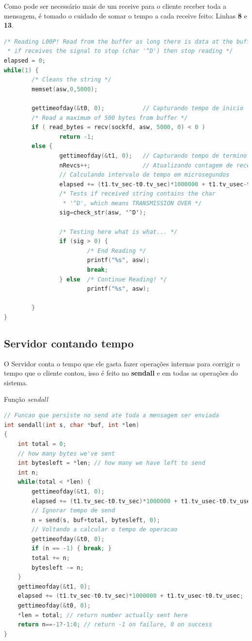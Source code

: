 \documentclass[10pt,a4paper]{report}
\begin{document}
Como pode ser necessário mais de um receive para o cliente receber toda a mensagem, é tomado o cuidado de somar o tempo a cada receive feito: Linhas \textbf{8} e \textbf{13}.
\begin{lstlisting}[language=C]
/* Reading L00P! Read from the buffer as long there is data at the buffer,
 * if receives the signal to stop (char '^D') then stop reading */
elapsed = 0;
while(1) {
        /* Cleans the string */
        memset(asw,0,5000);

        gettimeofday(&t0, 0);           // Capturando tempo de inicio
        /* Read a maximum of 500 bytes from buffer */
        if ( read_bytes = recv(sockfd, asw, 5000, 0) < 0 )
                return -1;
        else {  
                gettimeofday(&t1, 0);   // Capturando tempo de termino 
                nRevcs++;               // Atualizando contagem de receive 
                // Calculando intervalo de tempo em microsegundos
                elapsed += (t1.tv_sec-t0.tv_sec)*1000000 + t1.tv_usec-t0.tv_usec;
                /* Tests if received string contains the char 
                 * '^D', which means TRANSMISSION OVER */
                sig=check_str(asw, '^D');

                /* Testing here what is what... */
                if (sig > 0) {
                        /* End Reading */
                        printf("%s", asw);
                        break;
                } else  /* Continue Reading! */
                        printf("%s", asw);

        }
}
\end{lstlisting}

\subsection{Servidor contando tempo}


O Servidor conta o tempo que ele gasta fazer operações internas para corrigir o tempo que o cliente contou, isso é feito no \textbf{sendall} e em todas as operações do sistema.
\begin{center}
Função \textit{sendall}
\end{center}
\begin{lstlisting}[language=C]
// Funcao que persiste no send ate toda a mensagem ser enviada
int sendall(int s, char *buf, int *len)
{
	int total = 0;
	// how many bytes we've sent
	int bytesleft = *len; // how many we have left to send
	int n;
	while(total < *len) {
		gettimeofday(&t1, 0);
		elapsed += (t1.tv_sec-t0.tv_sec)*1000000 + t1.tv_usec-t0.tv_usec;
		// Ignorar tempo de send
		n = send(s, buf+total, bytesleft, 0);
		// Voltando a calcular o tempo de operacao
		gettimeofday(&t0, 0);
		if (n == -1) { break; }
		total += n;
		bytesleft -= n;
	}
	gettimeofday(&t1, 0);
	elapsed += (t1.tv_sec-t0.tv_sec)*1000000 + t1.tv_usec-t0.tv_usec;
	gettimeofday(&t0, 0);
	*len = total; // return number actually sent here
	return n==-1?-1:0; // return -1 on failure, 0 on success
}
\end{lstlisting}
\end{document}
